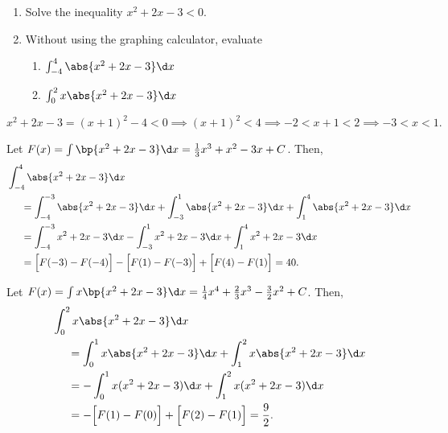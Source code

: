 \begin{problem}
    \begin{enumerate}
        \item Solve the inequality $x^2 + 2x - 3 < 0$.
        \item Without using the graphing calculator, evaluate
        \begin{enumerate}
            \item $\int_{-4}^4 \abs{x^2 + 2x - 3} \d x$
            \item $\int_0^2 x\abs{x^2 + 2x - 3} \d x$
        \end{enumerate}
    \end{enumerate}
\end{problem}
\begin{solution}
    \begin{ppart}
        \[x^2 + 2x - 3 = (x+1)^2 - 4 < 0 \implies (x+1)^2 < 4 
        \implies -2 < x+1 < 2 \implies -3 < x < 1.\]
    \end{ppart}
    \begin{ppart}
        \begin{psubpart}
            Let $F(x) = \int \bp{x^2 + 2x - 3}\d x = \frac13 x^3 + x^2 - 3x + C$. Then,
            \begin{align*}
                &\int_{-4}^4 \abs{x^2 + 2x - 3} \d x\\
                &\mspace{25 mu}= \int_{-4}^{-3} \abs{x^2 + 2x - 3} \d x + \int_{-3}^1 \abs{x^2 + 2x - 3} \d x + \int_1^4 \abs{x^2 + 2x - 3} \d x\\
                &\mspace{25 mu}= \int_{-4}^{-3} x^2 + 2x - 3 \d x - \int_{-3}^1 x^2 + 2x - 3 \d x + \int_1^4 x^2 + 2x - 3 \d x\\
                &\mspace{25 mu}= \Big[F(-3) - F(-4)\Big] - \Big[F(1) - F(-3)\Big] + \Big[F(4) - F(1)\Big] = 40.
            \end{align*}
        \end{psubpart}
        \begin{psubpart}
            Let $F(x) = \int x \bp{x^2 + 2x - 3} \d x = \frac14 x^4 + \frac23 x^3 - \frac32 x^2 + C$. Then,
            \begin{align*}
                &\int_0^2 x\abs{x^2 + 2x - 3} \d x \\
                &\mspace{25 mu}= \int_0^1 x\abs{x^2 + 2x - 3} \d x + \int_1^2 x\abs{x^2 + 2x - 3} \d x\\
                &\mspace{25 mu}= -\int_0^1 x(x^2 + 2x - 3) \d x + \int_1^2 x(x^2 + 2x - 3) \d x\\
                &\mspace{25 mu}= -\Big[F(1) - F(0)\Big] + \Big[F(2) - F(1)\Big] = \frac92.
            \end{align*}
        \end{psubpart}
    \end{ppart}
\end{solution}

